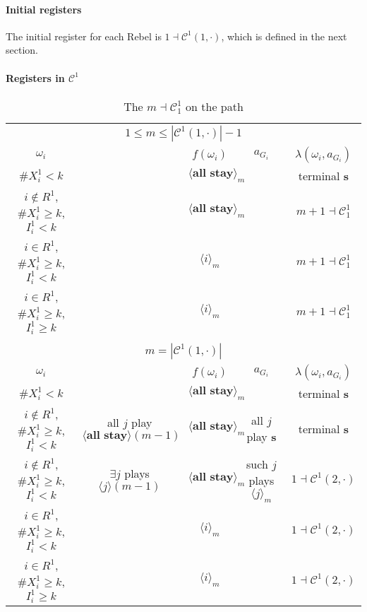 \documentclass[12pt,letter]{article}
\newcommand{\Kappa}{\mathcal{C}}
\theoremstyle{definition}
\theoremstyle{remark}
\theoremstyle{claim}
\begin{document}
\paragraph{Initial registers}
The initial register for each Rebel is $1\dashv\Kappa^1(1,\cdot)$, which is defined in the next section.
\paragraph{Registers in $\Kappa^1$}

\begin{landscape}
\begin{table}[!htbp]
\caption{The $m\dashv\Kappa^1_{1}$ on the path}
\label{table:eqm_path_k01}
\begin{center}
\begin{tabular}{c c | c | c | c }
\multicolumn{5}{c}{$1\leq m \leq |\Kappa^1(1,\cdot)|-1$}\\
$\omega_i$ 	 & 	   &	$f(\omega_i)$  &	$a_{G_i}$ & $\lambda(\omega_i,a_{G_i})$ \\
\hline
\hline
$\# X^1_i<k$  	& 	 &$\langle \textbf{all stay} \rangle_m$ &	& terminal \textbf{s}\\
$i\notin R^1$, $\# X^1_i\geq k$, $I^1_i< k$  	&  &$\langle \textbf{all stay} \rangle_m$ & 	& $m+1\dashv\Kappa^1_{1}$\\
$i\in R^1$, $\# X^1_i\geq k$, $I^1_i< k$  	& 	 &$\langle i \rangle_m$	&  & $m+1\dashv \Kappa^1_{1}$\\
$i\in R^1$, $\# X^1_i\geq k$, $I^1_i\geq k$  	& 	 &$\langle i \rangle_m$	&  & $m+1\dashv \Kappa^1_{1}$\\
\hline
\\
\multicolumn{5}{c}{$m=|\Kappa^1(1,\cdot)|$}\\
$\omega_i$ 	 & 	   &	$f(\omega_i)$  &	$a_{G_i}$ & $\lambda(\omega_i,a_{G_i})$ \\
\hline
\hline
$\# X^1_i<k$  	& 	& $\langle \textbf{all stay} \rangle_m$	&     & terminal \textbf{s}\\
$i\notin R^1$, $\# X^1_i\geq k$, $I^1_i< k$   	& all $j$ play $\langle \textbf{all stay} \rangle(m-1)$ & $\langle \textbf{all stay} \rangle_m$	 & all $j$ play \textbf{s} & terminal \textbf{s}\\
$i\notin R^1$, $\# X^1_i\geq k$, $I^1_i< k$   	& $\exists j$ plays $\langle j \rangle(m-1)$ & $\langle \textbf{all stay} \rangle_m$	& such $j$ plays $\langle j \rangle_m$  & $1\dashv \Kappa^1(2,\cdot)$\\
$i\in R^1$, $\# X^1_i\geq k$, $I^1_i< k$   	& 	& $\langle i \rangle_m$	&& $1\dashv \Kappa^1(2,\cdot)$ \\
$i\in R^1$, $\# X^1_i\geq k$, $I^1_i\geq k$  	& 	& $\langle i \rangle_m$ &	& $1\dashv \Kappa^1(2,\cdot)$ \\
\hline
\end{tabular}
\end{center}
\end{table}



\end{landscape}
\end{document}
